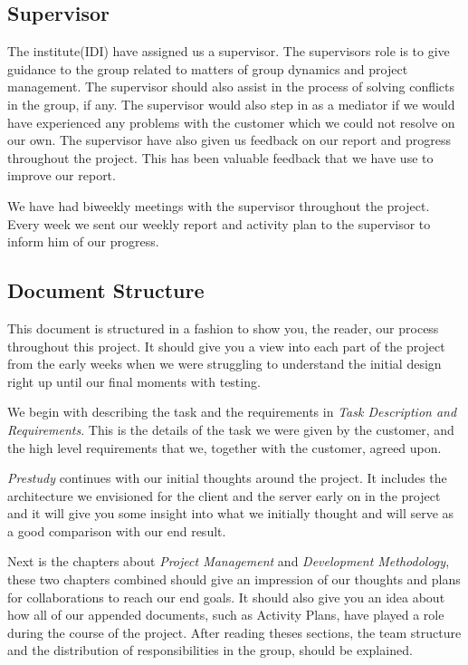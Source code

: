     
    \subsection{Supervisor}\label{Supervisor}
    
    The institute(IDI) have assigned us a supervisor. The supervisors role is to give guidance to the group related to matters of group dynamics and project management. The supervisor should also assist in the process of solving conflicts in the group, if any. The supervisor would also step in as a mediator if we would have experienced any problems with the customer which we could not resolve on our own. The supervisor have also given us feedback on our report and progress throughout the project. This has been valuable feedback that we have use to improve our report.  
    
    We have had biweekly meetings with the supervisor throughout the project. Every week we sent our weekly report and activity plan to the supervisor to inform him of our progress. 
    
    
    \subsection{Document Structure}\label{Document Structure}
    This document is structured in a fashion to show you, the reader, our process throughout this project. It should give you a view into each part of the project from the early weeks when we were struggling to understand the initial design right up until our final moments with testing. 
    
    We begin with describing the task and the requirements in \emph{Task Description and Requirements}. This is the details of the task we were given by the customer, and the high level requirements that we, together with the customer, agreed upon.
    
    \emph{Prestudy} continues with our initial thoughts around the project. It includes the architecture we envisioned for the client and the server early on in the project and it will give you some insight into what we initially thought and will serve as a good comparison with our end result.
    
    Next is the chapters about \emph{Project Management} and \emph{Development Methodology}, these two chapters combined should give an impression of our thoughts and plans for collaborations to reach our end goals. It should also give you an idea about how all of our appended documents, such as Activity Plans, have played a role during the course of the project. After reading theses sections, the team structure and the distribution of responsibilities in the group, should be explained.
    
